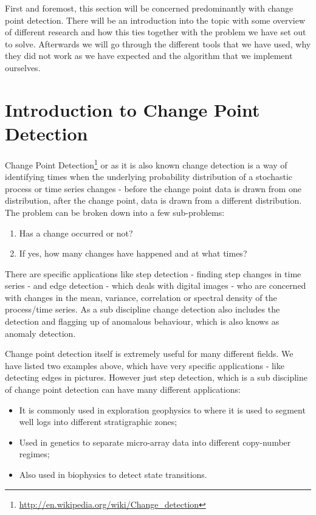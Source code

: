 \documentclass[minf,twoside,singlespacing,parskip,frontabs,notimes,12pt]{infthesis} %
\begin{document}
First and foremost, this section will be concerned predominantly with change point detection. There will be an introduction into the topic with some overview of different research and how this ties together with the problem we have set out to solve. Afterwards we will go through the different tools that we have used, why they did not work as we have expected and the algorithm that we implement ourselves. 


\section{Introduction to Change Point Detection}


Change Point Detection\footnote{\url{http://en.wikipedia.org/wiki/Change_detection}} or as it is also known change detection is a way of identifying times when the underlying probability distribution of a stochastic process or time series changes - before the change point data is drawn from one distribution, after the change point, data is drawn from a different distribution. The problem can be broken down into a few sub-problems:
\begin{enumerate}
\item Has a change occurred or not?
\item If yes, how many changes have happened and at what times?
\end{enumerate}

There are specific applications like step detection - finding step changes in time series - and edge detection - which deals with digital images - who are concerned with changes in the mean, variance, correlation or spectral density of the process/time series. As a sub discipline change detection also includes the detection and flagging up of anomalous behaviour, which is also knows as anomaly detection. 

Change point detection itself is extremely useful for many different fields. We have listed two examples above, which have very specific applications - like detecting edges in pictures. However just step detection, which is a sub discipline of change point detection can have many different applications:
\begin{itemize}
\item It is commonly used in exploration geophysics to where it is used to segment well logs into different stratigraphic zones;
\item Used in genetics to separate micro-array data into different copy-number regimes;
\item Also used in biophysics to detect state transitions.
\end{itemize}
 
\end{document}
